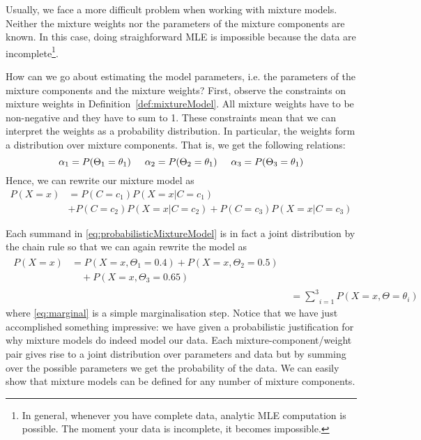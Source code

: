 Usually, we face a more difficult problem when working with mixture models. Neither the mixture
weights nor the parameters of the mixture components are known. In this case, doing straighforward MLE is impossible because the data are
incomplete\footnote{In general, whenever you have complete data, analytic MLE computation is possible. The moment your data is incomplete, it becomes impossible.}. 

How can we go about estimating the model parameters, i.e. the parameters of the mixture components and the mixture weights? First, observe the constraints
on mixture weights in Definition~\ref{def:mixtureModel}. All mixture weights have to be non-negative and they have to sum to 1.
These constraints mean that we can interpret the weights as a probability distribution. In particular, the weights form a distribution over 
mixture components. That is, we get the following relations:
\begin{equation}
\alpha_{1} = P(\Theta_{1} = \theta_{1}) \hskip 0.5cm \alpha_{2} = P(\Theta_{2} = \theta_{1}) \hskip 0.5cm \alpha_{3} = P(\Theta_{3} = \theta_{1})
\end{equation}
Hence, we can rewrite our mixture model as
\begin{align} 
P(X=x) &= P(C = c_{1})P(X=x|C = c_{1}) \label{eq:probabilisticMixtureModel} \\ 
&+ P(C = c_{2})P(X=x|C = c_{2}) + P(C = c_{3})P(X=x|C = c_{3}) \nonumber
\end{align}

Each summand
in \eqref{eq:probabilisticMixtureModel} is in fact a joint distribution by the chain rule so that we can again rewrite the model as
\begin{align}
\begin{split}\label{eq:marginal}
P(X=x) &= P(X=x,\Theta_{1}=0.4) + P(X=x,\Theta_{2}=0.5)  \\
&\quad + P(X=x,\Theta_{3}=0.65)
\end{split} \\
&= \underset{i=1}{\overset{3}{{\sum}}} P(X=x,\Theta=\theta_{i}) \nonumber
\end{align}
where \eqref{eq:marginal} is a simple marginalisation step. Notice that we have just accomplished something impressive: we have given a probabilistic justification
for why mixture models do indeed model our data. Each mixture-component/weight pair gives rise to a joint distribution over parameters and data but by summing over the 
possible parameters we get the probability of the data. We can easily show that mixture models can be defined for any number of mixture components.

